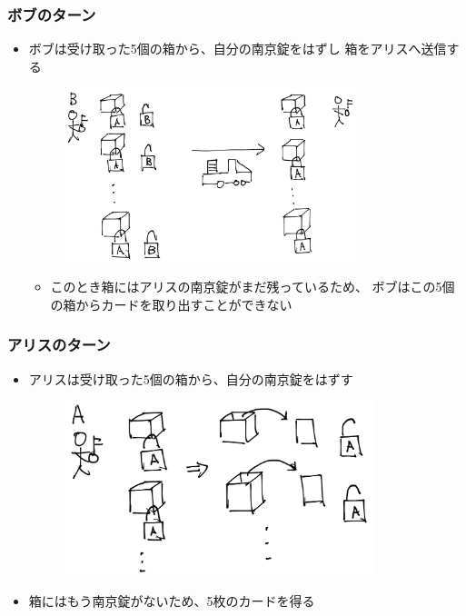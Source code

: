 \begin{frame}
  \frametitle{\showIndex ボブのターン}

  \begin{itemize}
    \item<+-> ボブは受け取った5個の箱から、自分の南京錠をはずし
    箱をアリスへ送信する
    \begin{figure}[h]
      \includegraphics[width=0.8\textwidth]{img/unlock_b.png}
    \end{figure}
    \begin{itemize}
      \item<+-> このとき箱にはアリスの南京錠がまだ残っているため、
      ボブはこの5個の箱からカードを取り出すことができない
    \end{itemize}
  \end{itemize}
\end{frame}


\begin{frame}
  \frametitle{\showIndex アリスのターン}

  \begin{itemize}
    \item<+-> アリスは受け取った5個の箱から、自分の南京錠をはずす
    \begin{figure}[h]
      \includegraphics[width=0.85\textwidth]{img/unlock_a.png}
    \end{figure}

    \item<+-> 箱にはもう南京錠がないため、5枚のカードを得る
  \end{itemize}
\end{frame}

